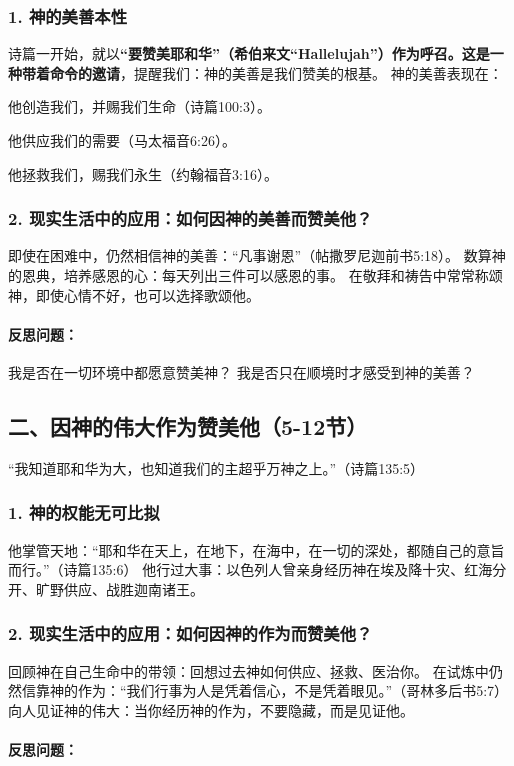 \documentclass[a4paper, 12pt]{article}
\begin{document}
\subsubsection*{1. 神的美善本性}
诗篇一开始，就以\textbf{“要赞美耶和华”（希伯来文“Hallelujah”）作为呼召。这是一种带着命令的邀请}，提醒我们：神的美善是我们赞美的根基。
神的美善表现在：

他创造我们，并赐我们生命（诗篇100:3）。

他供应我们的需要（马太福音6:26）。

他拯救我们，赐我们永生（约翰福音3:16）。

\subsubsection*{2. 现实生活中的应用：如何因神的美善而赞美他？}
即使在困难中，仍然相信神的美善：“凡事谢恩”（帖撒罗尼迦前书5:18）。
数算神的恩典，培养感恩的心：每天列出三件可以感恩的事。
在敬拜和祷告中常常称颂神，即使心情不好，也可以选择歌颂他。
\paragraph*{反思问题：}

我是否在一切环境中都愿意赞美神？
我是否只在顺境时才感受到神的美善？
\subsection*{二、因神的伟大作为赞美他（5-12节）}
“我知道耶和华为大，也知道我们的主超乎万神之上。”（诗篇135:5）

\subsubsection*{1. 神的权能无可比拟}
他掌管天地：“耶和华在天上，在地下，在海中，在一切的深处，都随自己的意旨而行。”（诗篇135:6）
他行过大事：以色列人曾亲身经历神在埃及降十灾、红海分开、旷野供应、战胜迦南诸王。
\subsubsection*{2. 现实生活中的应用：如何因神的作为而赞美他？}
回顾神在自己生命中的带领：回想过去神如何供应、拯救、医治你。
在试炼中仍然信靠神的作为：“我们行事为人是凭着信心，不是凭着眼见。”（哥林多后书5:7）
向人见证神的伟大：当你经历神的作为，不要隐藏，而是见证他。
\paragraph*{反思问题：}
\end{document}
